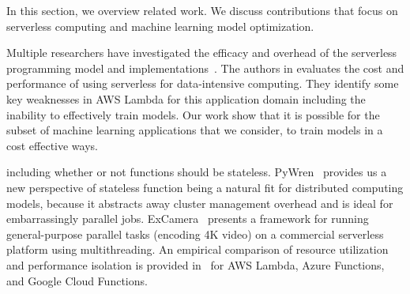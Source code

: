 In this section, we overview related work. We discuss contributions that focus
on serverless computing and machine learning model optimization. 

Multiple researchers have investigated the efficacy and overhead of the
serverless programming model and 
implementations~\cite{ref:jonas2017occupy,ref:onesteptwostep, ref:baldini2017,ref:lin2018tracking}.
The authors in \cite{ref:onesteptwostep} evaluates the cost and performance of using
serverless for data-intensive computing.  They identify some key weaknesses in AWS
Lambda for this application domain including the inability to effectively train models.
Our work show that it is possible for the subset of machine learning applications that we 
consider, to train models in a cost effective ways.

including whether or not functions should be stateless. PyWren~\cite{ref:jonas2017occupy} provides us 
a new perspective of stateless function being a natural fit for distributed computing models, because it 
abstracts away cluster management overhead and is ideal for embarrassingly parallel jobs. 
ExCamera~\cite{ref:encoding} presents a 
framework for running general-purpose parallel tasks (encoding 4K video) 
on a commercial serverless platform using multithreading. 
An empirical comparison of resource utilization and performance isolation
is provided in~\cite{ref:peeking} for AWS Lambda, 
Azure Functions, and Google Cloud Functions.


